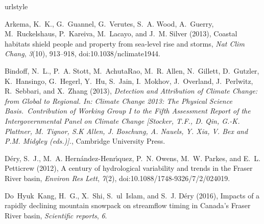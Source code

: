 \documentclass[draft,linenumbers]{AGUJournal}
\begin{document}


%

\begin{thebibliography}{38}
\providecommand{\natexlab}[1]{#1}
\expandafter\ifx\csname urlstyle\endcsname\relax
  \providecommand{\doi}[1]{doi:\discretionary{}{}{}#1}\else
  \providecommand{\doi}{doi:\discretionary{}{}{}\begingroup
  \urlstyle{rm}\Url}\fi

Arkema, K.~K., G.~Guannel, G.~Verutes, S.~A. Wood, A.~Guerry, M.~Ruckelshaus,
  P.~Kareiva, M.~Lacayo, and J.~M. Silver (2013), Coastal habitats shield
  people and property from sea-level rise and storms, \textit{Nat Clim Chang},
  \textit{3}(10), 913--918, \doi{10.1038/nclimate1944}.

Bindoff, N.~L., P.~A. Stott, M.~{AchutaRao}, M.~R. Allen, N.~Gillett,
  D.~Gutzler, K.~Hansingo, G.~Hegerl, Y.~Hu, S.~Jain, I.~Mokhov, J.~Overland,
  J.~Perlwitz, R.~Sebbari, and X.~Zhang (2013), \textit{{Detection and
  Attribution of Climate Change: from Global to Regional}. In: {Climate Change
  2013}: The Physical Science Basis.~Contribution of Working Group I to the
  Fifth Assessment Report of the {Intergovernmental Panel on Climate Change}
  {[Stocker, T.F., D. Qin, G.-K. Plattner, M. Tignor, S.K Allen, J. Boschung,
  A. Nauels, Y. Xia, V. Bex and P.M. Midgley (eds.)].}}, Cambridge University
  Press.

D{\'e}ry, S.~J., M.~A. {Hern{\'a}ndez-Henr{\'\i}quez}, P.~N. Owens, M.~W.
  Parkes, and E.~L. Petticrew (2012), A century of hydrological variability and
  trends in the {Fraser River} basin, \textit{Environ Res Lett}, \textit{7}(2),
  \doi{10.1088/1748-9326/7/2/024019}.

Do~Hyuk~Kang, H.~G., X.~Shi, S.~ul~Islam, and S.~J. D{\'e}ry (2016), Impacts of
		a rapidly declining mountain snowpack on streamflow timing in {C}anada{'}s
  {Fraser River} basin, \textit{Scientific reports}, \textit{6}.


\end{thebibliography}
\end{document}
